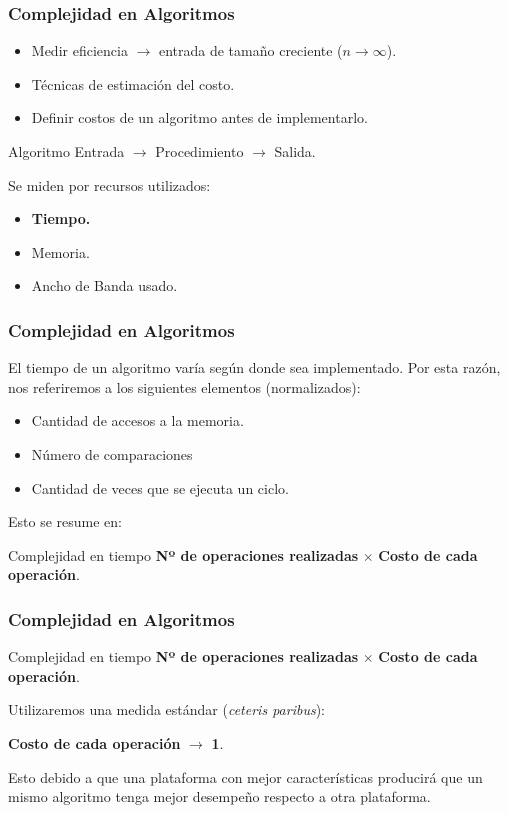 \documentclass{beamer}
\begin{document}
\begin{frame}[fragile]
 \frametitle{Complejidad en Algoritmos}
\small
\begin{itemize}
\item Medir eficiencia $\rightarrow$ entrada de tamaño creciente ($n \rightarrow \infty$).
\item Técnicas de estimación del costo.
\item Definir costos de un algoritmo antes de implementarlo.
\end{itemize}

\begin{block}{Algoritmo}
\medskip
\centering Entrada $\rightarrow$ Procedimiento $\rightarrow$ Salida.
\medskip
\end{block}

Se miden por recursos utilizados:
\begin{itemize}
\item \textbf{Tiempo.}
\item Memoria.
\item Ancho de Banda usado.
\end{itemize}
\end{frame}

\begin{frame}[fragile]
 \frametitle{Complejidad en Algoritmos}
\small El tiempo de un algoritmo varía según donde sea implementado. Por esta razón, nos referiremos a los siguientes elementos (normalizados):

\begin{itemize}
\item Cantidad de accesos a la memoria.
\item Número de comparaciones
\item Cantidad de veces que se ejecuta un ciclo.
\end{itemize}
Esto se resume en:
\begin{block}{Complejidad en tiempo}
\medskip
\centering \textbf{Nº de operaciones realizadas} $\times$ \textbf{Costo de cada operación}.
\medskip
\end{block}
\end{frame}

\begin{frame}[fragile]
 \frametitle{Complejidad en Algoritmos}
\begin{block}{Complejidad en tiempo}
\medskip
\centering \textbf{Nº de operaciones realizadas} $\times$ \textbf{Costo de cada operación}.
\medskip
\end{block}

Utilizaremos una medida estándar (\textit{ceteris paribus}):
\begin{center} \textbf{Costo de cada operación} $\rightarrow$ \textbf{1}. \end{center}
\medskip

Esto debido a que una plataforma con mejor características producirá que un mismo algoritmo tenga mejor desempeño respecto a otra plataforma.
\end{frame}
\end{document}
